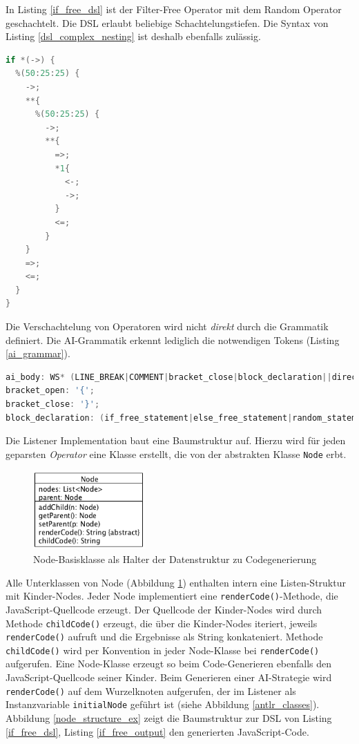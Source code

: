 \documentclass[conference]{IEEEtran}
\begin{document}
In Listing \ref{if_free_dsl} ist der Filter-Free Operator mit dem Random Operator geschachtelt. Die DSL erlaubt beliebige Schachtelungstiefen. Die Syntax von Listing \ref{dsl_complex_nesting} ist deshalb ebenfalls zulässig.

\begin{lstlisting}[language=Java, captionpos=b, caption=Komplexere Verschachtelung in AI DSL, label=dsl_complex_nesting]
if *(->) {
  %(50:25:25) {
    ->;
    **{
      %(50:25:25) {
        ->;
        **{
          =>;
          *1{
            <-;
            ->;
          }
          <=;
        }
    }
    =>;
    <=;
  }
}
\end{lstlisting}

Die Verschachtelung von Operatoren wird nicht \emph{direkt} durch die Grammatik definiert. Die AI-Grammatik erkennt lediglich die notwendigen Tokens (Listing \ref{ai_grammar}).

\begin{lstlisting}[language=Java, captionpos=b, caption=Ausschnitt der AI Grammatik, label=ai_grammar]
ai_body: WS* (LINE_BREAK|COMMENT|bracket_close|block_declaration||direction_statement);
bracket_open: '{';
bracket_close: '}';
block_declaration: (if_free_statement|else_free_statement|random_statement|leave_free_statement|get_nth_free_statement);
\end{lstlisting}

Die Listener Implementation baut eine Baumstruktur auf. Hierzu wird für jeden geparsten \emph{Operator} eine Klasse erstellt, die von der abstrakten Klasse \texttt{Node} erbt.


\begin{figure}[!htb]
\centering
\includegraphics[width=1.7in]{node_structure_node.png}

\caption{Node-Basisklasse als Halter der Datenstruktur zu Codegenerierung}
\label{node_class}
\end{figure}

Alle Unterklassen von Node (Abbildung  \ref{node_class}) enthalten intern eine Listen-Struktur mit Kinder-Nodes. Jeder Node implementiert eine \texttt{renderCode()}-Methode, die JavaScript-Quellcode erzeugt. Der Quellcode der Kinder-Nodes wird durch Methode \texttt{childCode()} erzeugt, die über die Kinder-Nodes iteriert, jeweils \texttt{renderCode()} aufruft und die Ergebnisse als String konkateniert. Methode \texttt{childCode()} wird per Konvention in jeder Node-Klasse bei \texttt{renderCode()} aufgerufen. Eine Node-Klasse erzeugt so beim Code-Generieren ebenfalls den JavaScript-Quellcode seiner Kinder. Beim Generieren einer AI-Strategie wird \texttt{renderCode()} auf dem Wurzelknoten aufgerufen, der im Listener als Instanzvariable \texttt{initialNode} geführt ist (siehe Abbildung \ref{antlr_classes}). Abbildung \ref{node_structure_ex} zeigt die Baumstruktur zur DSL von Listing \ref{if_free_dsl}, Listing \ref{if_free_output} den generierten JavaScript-Code.
\end{document}
